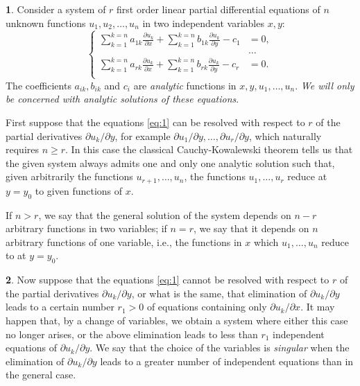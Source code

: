\documentclass[leqno,11pt]{article}
\newcommand{\pd}{\partial}
\theoremstyle{shape1}
\theoremstyle{shape0}
\theoremstyle{shape2}
\theoremstyle{definition}
\begin{document}
\textbf{1}. Consider a system of $r$ first order linear partial differential equations of $n$ unknown functions $u_{1}, u_{2},\dots,u_{n}$ in two independent variables $x,y$:
\begin{equation}
  \label{eq:1}
  \left\{
    \begin{aligned}
      \sum_{k=1}^{k=n}a_{1k}\frac{\pd u_{k}}{\pd x}+\sum_{k=1}^{k=n}b_{1k}\frac{\pd u_{k}}{\pd y}-c_{1}&=0,\\
      &\dots\\
      \sum_{k=1}^{k=n}a_{rk}\frac{\pd u_{k}}{\pd x}+\sum_{k=1}^{k=n}b_{rk}\frac{\pd u_{k}}{\pd y}-c_{r}&=0.\\
    \end{aligned}
  \right.
\end{equation}
The coefficients $a_{ik},b_{ik}$ and $c_{i}$ are \emph{analytic} functions in $x,y,u_{1},\dots,u_{n}$. \emph{We will only be concerned with analytic solutions of these equations}.

First suppose that the equations \eqref{eq:1} can be resolved with respect to $r$ of the partial derivatives $\pd u_{k}/\pd y$, for example $\pd u_{1}/\pd y,\dots,\pd u_{r}/\pd y$, which naturally requires $n\ge r$. In this case the classical Cauchy-Kowalewski theorem tells us that the given system always admits one and only one analytic solution such that, given arbitrarily the functions $u_{r+1},\dots,u_{n}$, the functions $u_{1},\dots, u_{r}$ reduce at $y=y_{0}$ to given functions of $x$.

If $n>r$, we say that the general solution of the system depends on $n-r$ arbitrary functions in two variables; if $n=r$, we say that it depends on $n$ arbitrary functions of one variable, i.e., the functions in $x$ which $u_{1},\dots, u_{n}$ reduce to at $y=y_{0}$.

\vspace{12pt}

\textbf{2}. Now suppose that the equations \eqref{eq:1} cannot be resolved with respect to $r$ of the partial derivatives $\pd u_{k}/\pd y$, or what is the same, that elimination of $\pd u_{k}/\pd y$ leads to a certain number $r_{1}>0$ of equations containing only $\pd u_{k}/\pd x$. It may happen that, by a change of variables, we obtain a system where either this case no longer arises, or the above elimination leads to less than $r_{1}$ independent equations of $\pd u_{k}/\pd y$. We say that the choice of the variables is \emph{singular} when the elimination of $\pd u_{k}/\pd y$ leads to a greater number of independent equations than in the general case.
\end{document}
